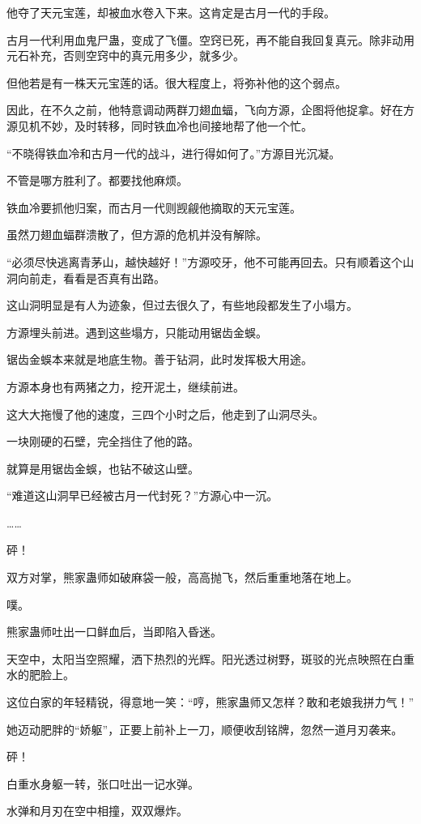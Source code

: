 \begin{this_body}
他夺了天元宝莲，却被血水卷入下来。这肯定是古月一代的手段。

古月一代利用血鬼尸蛊，变成了飞僵。空窍已死，再不能自我回复真元。除非动用元石补充，否则空窍中的真元用多少，就多少。

但他若是有一株天元宝莲的话。很大程度上，将弥补他的这个弱点。

因此，在不久之前，他特意调动两群刀翅血蝠，飞向方源，企图将他捉拿。好在方源见机不妙，及时转移，同时铁血冷也间接地帮了他一个忙。

“不晓得铁血冷和古月一代的战斗，进行得如何了。”方源目光沉凝。

不管是哪方胜利了。都要找他麻烦。

铁血冷要抓他归案，而古月一代则觊觎他摘取的天元宝莲。

虽然刀翅血蝠群溃散了，但方源的危机并没有解除。

“必须尽快逃离青茅山，越快越好！”方源咬牙，他不可能再回去。只有顺着这个山洞向前走，看看是否真有出路。

这山洞明显是有人为迹象，但过去很久了，有些地段都发生了小塌方。

方源埋头前进。遇到这些塌方，只能动用锯齿金蜈。

锯齿金蜈本来就是地底生物。善于钻洞，此时发挥极大用途。

方源本身也有两猪之力，挖开泥土，继续前进。

这大大拖慢了他的速度，三四个小时之后，他走到了山洞尽头。

一块刚硬的石壁，完全挡住了他的路。

就算是用锯齿金蜈，也钻不破这山壁。

“难道这山洞早已经被古月一代封死？”方源心中一沉。

……

砰！

双方对掌，熊家蛊师如破麻袋一般，高高抛飞，然后重重地落在地上。

噗。

熊家蛊师吐出一口鲜血后，当即陷入昏迷。

天空中，太阳当空照耀，洒下热烈的光辉。阳光透过树野，斑驳的光点映照在白重水的肥脸上。

这位白家的年轻精锐，得意地一笑：“哼，熊家蛊师又怎样？敢和老娘我拼力气！”

她迈动肥胖的“娇躯”，正要上前补上一刀，顺便收刮铭牌，忽然一道月刃袭来。

砰！

白重水身躯一转，张口吐出一记水弹。

水弹和月刃在空中相撞，双双爆炸。


\end{this_body}
